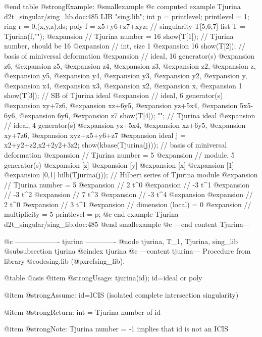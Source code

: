 @end table
@strong{Example:}
@smallexample
@c computed example Tjurina d2t_singular/sing_lib.doc:485 
LIB "sing.lib";
int p      = printlevel;
printlevel = 1;
ring r     = 0,(x,y,z),ds;
poly f     = x5+y6+z7+xyz;        // singularity T[5,6,7]
list T     = Tjurina(f,"");
@expansion{} // Tjurina number = 16
show(T[1]);                       // Tjurina number, should be 16
@expansion{} // int, size 1
@expansion{} 16
show(T[2]);                       // basis of miniversal deformation
@expansion{} // ideal, 16 generator(s)
@expansion{} z6,
@expansion{} z5,
@expansion{} z4,
@expansion{} z3,
@expansion{} z2,
@expansion{} z,
@expansion{} y5,
@expansion{} y4,
@expansion{} y3,
@expansion{} y2,
@expansion{} y,
@expansion{} x4,
@expansion{} x3,
@expansion{} x2,
@expansion{} x,
@expansion{} 1
show(T[3]);                       // SB of Tjurina ideal
@expansion{} // ideal, 6 generator(s)
@expansion{} xy+7z6,
@expansion{} xz+6y5,
@expansion{} yz+5x4,
@expansion{} 5x5-6y6,
@expansion{} 6y6,
@expansion{} z7
show(T[4]); "";                   // Tjurina ideal
@expansion{} // ideal, 4 generator(s)
@expansion{} yz+5x4,
@expansion{} xz+6y5,
@expansion{} xy+7z6,
@expansion{} xyz+x5+y6+z7
@expansion{} 
ideal j    = x2+y2+z2,x2+2y2+3z2;
show(kbase(Tjurina(j)));          // basis of miniversal deformation
@expansion{} // Tjurina number = 5
@expansion{} // module, 5 generator(s)
@expansion{} [z]
@expansion{} [y]
@expansion{} [x]
@expansion{} [1]
@expansion{} [0,1]
hilb(Tjurina(j));                 // Hilbert series of Tjurina module
@expansion{} // Tjurina number = 5
@expansion{} //         2 t^0
@expansion{} //        -3 t^1
@expansion{} //        -3 t^2
@expansion{} //         7 t^3
@expansion{} //        -3 t^4
@expansion{} 
@expansion{} //         2 t^0
@expansion{} //         3 t^1
@expansion{} // dimension (local)   = 0
@expansion{} // multiplicity = 5
printlevel = p;
@c end example Tjurina d2t_singular/sing_lib.doc:485
@end smallexample
@c ---end content Tjurina---

@c ------------------- tjurina -------------
@node tjurina, T_1, Tjurina, sing_lib
@subsubsection tjurina
@cindex tjurina
@c ---content tjurina---
Procedure from library @code{sing.lib} (@pxref{sing_lib}).

@table @asis
@item @strong{Usage:}
tjurina(id); id=ideal or poly

@item @strong{Assume:}
id=ICIS (isolated complete intersection singularity)

@item @strong{Return:}
int = Tjurina number of id

@item @strong{Note:}
Tjurina number = -1 implies that id is not an ICIS


